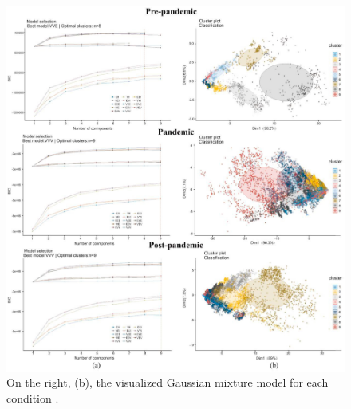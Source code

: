 \documentclass[12pt]{article}
\begin{document}
\begin{figure}
\centering
\includegraphics{2.jpg}
\caption{On the right, (b), the visualized Gaussian mixture model for
each condition \citep{huang2023gaussian}.}
\end{figure}
\end{document}
